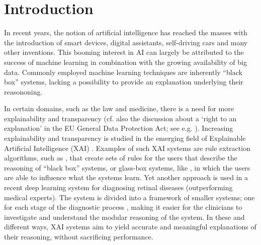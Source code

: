 \documentclass[letterpaper]{article} %
\begin{document}
\begin{abstract}
\end{abstract}

\section{Introduction}
In recent years, the notion of artificial intelligence has reached the masses with the introduction of smart devices, digital assistants, self-driving cars and many other inventions. This booming interest in AI can largely be attributed to the success of machine learning in combination with the growing availability of big data. Commonly employed machine learning techniques are inherently ``black box'' systems, lacking a possibility to provide an explanation underlying their reasononing. 

In certain domains, such as the law and medicine, there is a need for more explainability and transparency (cf. also the discussion about a `right to an explanation' in the EU General Data Protection Act; see e.g. \cite{edwards2017slave}).
Increasing explainability and transparency is studied in the emerging field of Explainable Artificial Intelligence (XAI) \cite{gunning2017explainable}. 
Examples of such XAI systems are rule extraction algorithms, such as \cite{lu2017neurorule}, that create  sets of rules for the users that describe the reasoning of ``black box'' systems, or glass-box systems, like \cite{holzinger2017glass}, in which the users are able to influence what the systems learn. Yet another approach is used in a recent deep learning system for diagnosing retinal diseases (outperforming medical experts). The system is divided into a framework of smaller systems; one for each stage of the diagnostic process \cite{de2018clinically}, making it easier for the clinicians to investigate and understand the modular reasoning of the system. In these and different ways, XAI systems aim to yield accurate and meaningful explanations of their reasoning, without sacrificing performance. 
\end{document}
